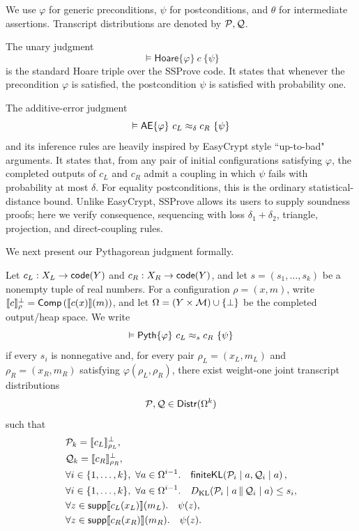 We use \(\varphi\) for generic preconditions, \(\psi\) for
postconditions, and \(\theta\) for intermediate assertions.
Transcript distributions are denoted by \(\mathcal{P},\mathcal{Q}\).

The unary judgment
\[
 \vDash\mathsf{Hoare}\{\varphi\}\ c\ \{\psi\}
\]
is the standard Hoare triple over the SSProve code.
It states that whenever the precondition \(\varphi\) is satisfied,
the postcondition \(\psi\) is satisfied with probability one.

The additive-error judgment
\[
 \vDash\AEJ\{\varphi\}\ c_L\approx_\delta c_R\ \{\psi\}
\]
and its inference rules are heavily inspired by EasyCrypt style ``up-to-bad" arguments.
It states that, from any pair of initial configurations satisfying \(\varphi\), the
completed outputs of \(c_L\) and \(c_R\) admit a coupling in which \(\psi\) fails
with probability at most \(\delta\).
For equality postconditions, this is the ordinary statistical-distance bound.
Unlike EasyCrypt, SSProve allows its users to supply soundness proofs;
here we verify consequence, sequencing with loss \(\delta_1+\delta_2\),
triangle, projection, and direct-coupling rules.

We next present our Pythagorean judgment formally.

\begin{definition}
\label{def:pyth-judgment}
Let \(c_L:X_L\to\mathsf{code}(Y)\) and \(c_R:X_R\to\mathsf{code}(Y)\), and let
\(s=(s_1,\ldots,s_k)\) be a nonempty tuple of real numbers.
For a configuration \(\rho=(x,m)\), write
\(\llbracket c\rrbracket^{\bot}_{\rho}=\mathsf{Comp}\left(\llbracket c(x)\rrbracket(m)\right)\), and let
\(\Omega=(Y\times\mathcal{M})\cup\{\bot\}\) be the completed output/heap space.
We write
\begin{equation}
 \vDash\Pyth\{\varphi\}\ c_L\approx_s c_R\ \{\psi\}
\end{equation}
if every \(s_i\) is nonnegative and, for every pair
\(\rho_L=(x_L,m_L)\) and \(\rho_R=(x_R,m_R)\) satisfying
\(\varphi(\rho_L,\rho_R)\), there exist weight-one joint transcript distributions
\[
 \mathcal{P},\mathcal{Q}\in\mathsf{Distr}(\Omega^k)
\]
such that
\[
\begin{aligned}
 &\mathcal{P}_k=\llbracket c_L\rrbracket^{\bot}_{\rho_L},
 \\
 &\mathcal{Q}_k=\llbracket c_R\rrbracket^{\bot}_{\rho_R},
 \\
 &\forall i\in\{1,\ldots,k\},\ \forall a\in\Omega^{i-1}.\quad
   \mathsf{finiteKL}\!\left(
     \mathcal{P}_i\mid a,\mathcal{Q}_i\mid a\right),
 \\
 &\forall i\in\{1,\ldots,k\},\ \forall a\in\Omega^{i-1}.\quad
   D_{\mathrm{KL}}\!\left(\mathcal{P}_i\mid a\,\|\,\mathcal{Q}_i\mid a\right)\leq s_i,
 \\
 &\forall z\in\mathsf{supp}\llbracket c_L(x_L)\rrbracket(m_L).\quad \psi(z),
 \\
 &\forall z\in\mathsf{supp}\llbracket c_R(x_R)\rrbracket(m_R).\quad \psi(z).
\end{aligned}
\]
\end{definition}


